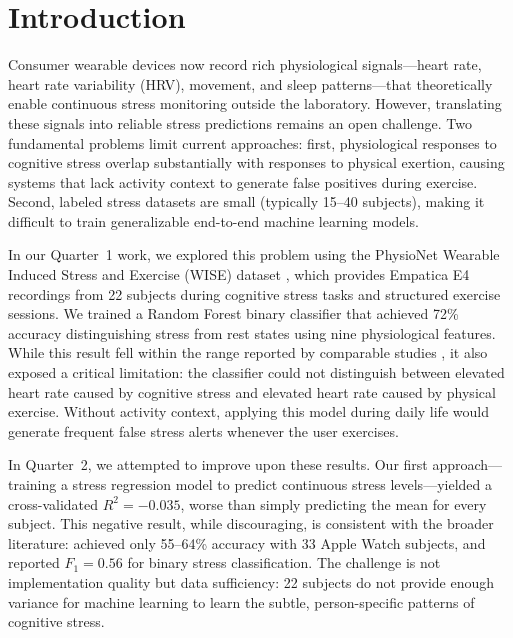 \documentclass[12pt,letterpaper]{article}
\begin{document}

\section{Introduction}

Consumer wearable devices now record rich physiological signals---heart rate, heart rate variability (HRV), movement, and sleep patterns---that theoretically enable continuous stress monitoring outside the laboratory. However, translating these signals into reliable stress predictions remains an open challenge. Two fundamental problems limit current approaches: first, physiological responses to cognitive stress overlap substantially with responses to physical exertion, causing systems that lack activity context to generate false positives during exercise. Second, labeled stress datasets are small (typically 15--40 subjects), making it difficult to train generalizable end-to-end machine learning models.

In our Quarter~1 work, we explored this problem using the PhysioNet Wearable Induced Stress and Exercise (WISE) dataset \citep{schlink2020wise}, which provides Empatica E4 recordings from 22 subjects during cognitive stress tasks and structured exercise sessions. We trained a Random Forest binary classifier that achieved 72\% accuracy distinguishing stress from rest states using nine physiological features. While this result fell within the range reported by comparable studies \citep{hickey2021smart, schmidt2018wesad}, it also exposed a critical limitation: the classifier could not distinguish between elevated heart rate caused by cognitive stress and elevated heart rate caused by physical exercise. Without activity context, applying this model during daily life would generate frequent false stress alerts whenever the user exercises.

In Quarter~2, we attempted to improve upon these results. Our first approach---training a stress regression model to predict continuous stress levels---yielded a cross-validated $R^2 = -0.035$, worse than simply predicting the mean for every subject. This negative result, while discouraging, is consistent with the broader literature: \cite{velmovitsky2022smartwatch} achieved only 55--64\% accuracy with 33 Apple Watch subjects, and \cite{bahameish2022stress} reported $F_1 = 0.56$ for binary stress classification. The challenge is not implementation quality but data sufficiency: 22 subjects do not provide enough variance for machine learning to learn the subtle, person-specific patterns of cognitive stress.
\end{document}
